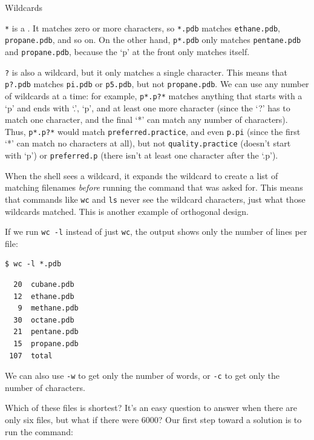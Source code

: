 \documentclass{book}
\begin{document}
\begin{swcbox}{Wildcards}

\texttt{*} is a . It matches zero or more
characters, so \texttt{*.pdb} matches \texttt{ethane.pdb},
\texttt{propane.pdb}, and so on. On the other hand, \texttt{p*.pdb} only
matches \texttt{pentane.pdb} and \texttt{propane.pdb}, because the `p'
at the front only matches itself.

\texttt{?} is also a wildcard, but it only matches a single character.
This means that \texttt{p?.pdb} matches \texttt{pi.pdb} or
\texttt{p5.pdb}, but not \texttt{propane.pdb}. We can use any number of
wildcards at a time: for example, \texttt{p*.p?*} matches anything that
starts with a `p' and ends with `.', `p', and at least one more
character (since the `?' has to match one character, and the final `*'
can match any number of characters). Thus, \texttt{p*.p?*} would match
\texttt{preferred.practice}, and even \texttt{p.pi} (since the first `*'
can match no characters at all), but not \texttt{quality.practice}
(doesn't start with `p') or \texttt{preferred.p} (there isn't at least
one character after the `.p').

When the shell sees a wildcard, it expands the wildcard to create a list
of matching filenames \emph{before} running the command that was asked
for. This means that commands like \texttt{wc} and \texttt{ls} never see
the wildcard characters, just what those wildcards matched. This is
another example of orthogonal design.

\end{swcbox}

If we run \texttt{wc -l} instead of just \texttt{wc}, the output shows
only the number of lines per file:

\begin{verbatim}
$ wc -l *.pdb
\end{verbatim}

\begin{verbatim}
  20  cubane.pdb
  12  ethane.pdb
   9  methane.pdb
  30  octane.pdb
  21  pentane.pdb
  15  propane.pdb
 107  total
\end{verbatim}

We can also use \texttt{-w} to get only the number of words, or
\texttt{-c} to get only the number of characters.

Which of these files is shortest? It's an easy question to answer when
there are only six files, but what if there were 6000? Our first step
toward a solution is to run the command:
\end{document}
